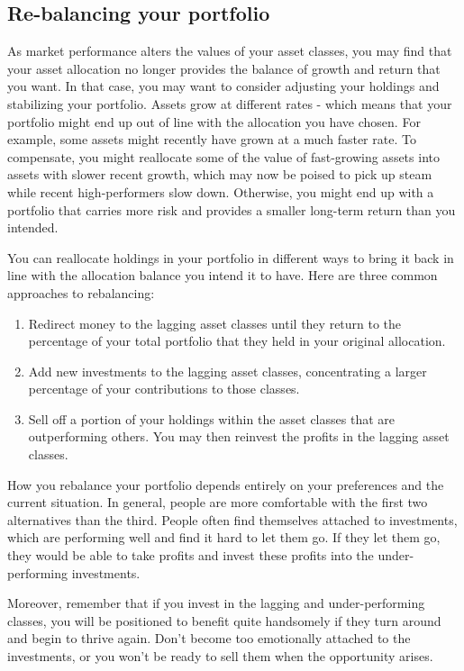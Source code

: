 \subsection{Re-balancing your portfolio}
As market performance alters the values of your asset classes, you may find that your asset allocation no longer provides the balance of growth and return that you want. In that case, you may want to consider adjusting your holdings and stabilizing your portfolio. Assets grow at different rates - which means that your portfolio might end up out of line with the allocation you have chosen. For example, some assets might recently have grown at a much faster rate. To compensate, you might reallocate some of the value of fast-growing assets into assets with slower recent growth, which may now be poised to pick up steam while recent high-performers slow down. Otherwise, you might end up with a portfolio that carries more risk and provides a smaller long-term return than you intended.\medskip 

You can reallocate holdings in your portfolio in different ways to bring it back in line with the allocation balance you intend it to have. Here are three common approaches to rebalancing:

\begin{enumerate}[label=(\alph*)]
    \item Redirect money to the lagging asset classes until they return to the percentage of your total portfolio that they held in your original allocation.
    \item Add new investments to the lagging asset classes, concentrating a larger percentage of your contributions to those classes.
    \item Sell off a portion of your holdings within the asset classes that are outperforming others. You may then reinvest the profits in the lagging asset classes.
\end{enumerate}

How you rebalance your portfolio depends entirely on your preferences and the current situation. In general, people are more comfortable with the first two alternatives than the third. People often find themselves attached to investments, which are performing well and find it hard to let them go. If they let them go, they would be able to take profits and invest these profits into the under-performing investments. 

Moreover, remember that if you invest in the lagging and under-performing classes, you will be positioned to benefit quite handsomely if they turn around and begin to thrive again. Don't become too emotionally attached to the investments, or you won't be ready to sell them when the opportunity arises.

